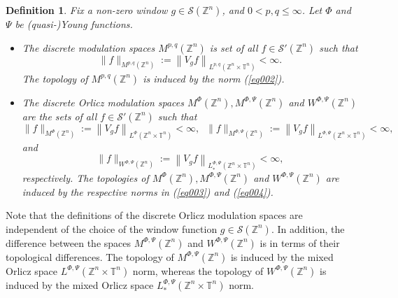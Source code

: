 \documentclass[a4paper,11pt, reqno]{amsart}
\theoremstyle{plain}
\newtheorem{Def}[theorem]{Definition}
\theoremstyle{definition}
\theoremstyle{remark}
\def \Z{{\mathbb Z}}
\def \T{{\mathbb T}}
\begin{document}
\begin{Def}
Fix a non-zero window $g \in \mathcal{S}(\Z^n)$, and $0 < p,q \leq \infty$. Let $\Phi$ and $\Psi$ be (quasi-)Young functions. 
\begin{itemize}
\item[(1)] The discrete modulation spaces $M^{p, q} (\Z^n)$ is set of all $f \in \mathcal{S'}(\Z^n)$ such that
\begin{equation}\label{eq002}
\|f\|_{M^{p, q}(\Z^n)} := \left\|V_g f\right\|_{L^{p, q}(\Z^n \times \T^n)}<\infty.
\end{equation} 
The topology of $M^{p, q}(\Z^n)$ is induced by the norm (\ref{eq002}).

\item[(2)] The discrete Orlicz modulation spaces $M^{\Phi} (\Z^n), M^{\Phi, \Psi}(\Z^n)$ and $W^{\Phi, \Psi}(\Z^n)$ are the sets of all $f \in \mathcal{S'}(\Z^n)$ such that
\begin{equation}\label{eq003}
\|f\|_{M^{\Phi}(\Z^n)} := \left\|V_g f\right\|_{L^{\Phi}(\Z^n \times \T^n)}< \infty,  \;\; \|f\|_{M^{\Phi, \Psi}(\Z^n)} := \left\|V_g f\right\|_{L^{\Phi, \Psi}(\Z^n \times \T^n)} < \infty ,
\end{equation} 
 and
\begin{equation}\label{eq004}
\|f\|_{W^{\Phi, \Psi}(\Z^n)} := \left\|V_g f\right\|_{L_{*}^{\Phi, \Psi}(\Z^n \times \T^n)} < \infty,
\end{equation} 
respectively. The topologies of $M^{\Phi}(\Z^n), M^{\Phi, \Psi}(\Z^n)$ and $W^{\Phi, \Psi}(\Z^n)$ are induced by the respective norms in (\ref{eq003}) and (\ref{eq004}).
\end{itemize}
\end{Def}

Note that the definitions of the discrete Orlicz modulation spaces are independent of the choice of the window function $g \in \mathcal{S}(\Z^n)$. In addition, the difference between the spaces $M^{\Phi, \Psi}(\Z^n)$ and $W^{\Phi, \Psi}(\Z^n)$ is in terms of their topological differences. The topology of $M^{\Phi, \Psi}(\Z^n)$ is induced by the mixed Orlicz space $L^{\Phi, \Psi}(\Z^n \times \T^n)$ norm, whereas the topology of $W^{\Phi, \Psi}(\Z^n)$ is induced by the mixed Orlicz space $L_{*}^{\Phi, \Psi}(\Z^n \times \T^n)$ norm.
\end{document}
